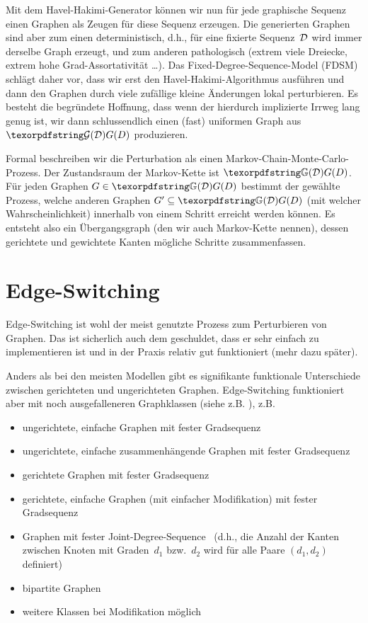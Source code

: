 Mit dem Havel-Hakimi-Generator können wir nun für jede graphische Sequenz einen Graphen als Zeugen für diese Sequenz erzeugen.
Die generierten Graphen sind aber zum einen deterministisch, d.h., für eine fixierte Sequenz~$\mathcal{D}$ wird immer derselbe Graph erzeugt, und zum anderen pathologisch (extrem viele Dreiecke, extrem hohe Grad-Assortativität \ldots).
Das Fixed-Degree-Sequence-Model (FDSM) schlägt daher vor, dass wir erst den Havel-Hakimi-Algorithmus ausführen und dann den Graphen durch viele zufällige kleine Änderungen lokal perturbieren.
Es besteht die begründete Hoffnung, dass wenn der hierdurch implizierte Irrweg lang genug ist, wir dann schlussendlich einen (fast) uniformen Graph aus $\Gd$ produzieren.

Formal beschreiben wir die Perturbation als einen Markov-Chain-Monte-Carlo-Prozess.
Der Zustandsraum der Markov-Kette ist $\gd$.
Für jeden Graphen $G \in \gd$ bestimmt der gewählte Prozess, welche anderen Graphen $G' \subseteq \gd$ (mit welcher Wahrscheinlichkeit) innerhalb von einem Schritt erreicht werden können.
Es entsteht also ein  Übergangsgraph (den wir auch Markov-Kette nennen), dessen gerichtete und gewichtete Kanten mögliche Schritte zusammenfassen.

\section{Edge-Switching}
Edge-Switching ist wohl der meist genutzte Prozess zum Perturbieren von Graphen.
Das ist sicherlich auch dem geschuldet, dass er sehr einfach zu implementieren ist und in der Praxis relativ gut funktioniert (mehr dazu später).

Anders als bei den meisten Modellen gibt es signifikante funktionale Unterschiede zwischen gerichteten und ungerichteten Graphen.
Edge-Switching funktioniert aber mit noch ausgefalleneren Graphklassen (siehe z.B. \cite{carstens_2017}), z.B.
\begin{itemize}
    \item ungerichtete, einfache Graphen mit fester Gradsequenz
    \item ungerichtete, einfache zusammenhängende Graphen  mit fester Gradsequenz \cite{DBLP:journals/compnet/VigerL16}
    \item gerichtete Graphen  mit fester Gradsequenz
    \item gerichtete, einfache Graphen (mit einfacher Modifikation)  mit fester Gradsequenz
    \item Graphen mit fester Joint-Degree-Sequence~\cite{DBLP:conf/alenex/StantonP11} (d.h., die Anzahl der Kanten zwischen Knoten mit Graden~$d_1$ bzw.~$d_2$ wird für alle Paare $(d_1, d_2)$ definiert)
    \item bipartite Graphen
    \item weitere Klassen bei Modifikation möglich
\end{itemize}

